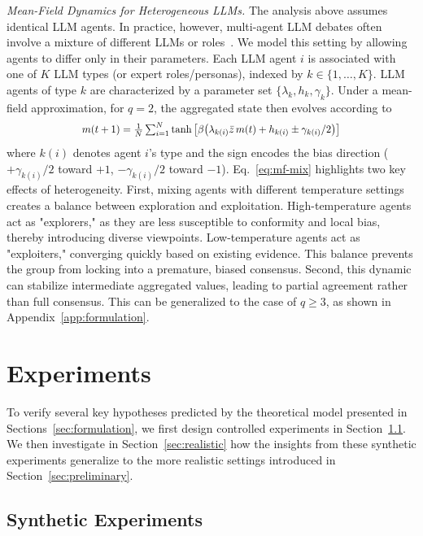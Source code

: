 \documentclass{article}
\theoremstyle{plain}
\theoremstyle{definition}
\theoremstyle{remark}
\begin{document}
\textsl{Mean-Field Dynamics for Heterogeneous LLMs.}
The analysis above assumes identical LLM agents.
In practice, however, multi-agent LLM debates often involve a mixture of different LLMs or roles~\cite{liang2023encouraging,chen2023agentverse}. 
We model this setting by allowing agents to differ only in their parameters. 
Each LLM agent $i$ is associated with one of $K$ LLM types (or expert roles/personas), indexed by $k\in\{1,\dots,K\}$.
LLM agents of type $k$ are characterized by a parameter set $\{\lambda_k, h_k, \gamma_k\}$. 
Under a mean-field approximation, for $q=2$, the aggregated state then evolves according to 
\begin{equation}\label{eq:mf-mix}
\scalebox{0.9}{$m(t+1) = \frac{1}{N} \sum_{i=1}^{N} \tanh \left[
\beta \bigl( \lambda_{k(i)} \bar{z}\, m(t)+h_{k(i)} \pm \gamma_{k(i)}/2 \bigr) \right]$}
\end{equation}
where $k(i)$ denotes agent $i$'s type and the sign encodes the bias direction ($+\gamma_{k(i)}/2$ toward $+1$, $-\gamma_{k(i)}/2$ toward $-1$). 
Eq.~\eqref{eq:mf-mix} highlights two key effects of heterogeneity. 
First, mixing agents with different temperature settings creates a balance between exploration and exploitation. High-temperature agents act as "explorers," as they are less susceptible to conformity and local bias, thereby introducing diverse viewpoints. Low-temperature agents act as "exploiters," converging quickly based on existing evidence. This balance prevents the group from locking into a premature, biased consensus.
Second, this dynamic can stabilize intermediate aggregated values, leading to partial agreement rather than full consensus.
This can be generalized to the case of $q \geq 3$, as shown in Appendix~\ref{app:formulation}. 


\section{Experiments}\label{sec:experiment}  
To verify several key hypotheses predicted by the theoretical model presented in Sections~\ref{sec:formulation}, we first design controlled experiments in Section~\ref{sec:synthetic}. 
We then investigate in Section~\ref{sec:realistic} how the insights from these synthetic experiments generalize to the more realistic settings introduced in Section~\ref{sec:preliminary}.


\subsection{Synthetic Experiments}\label{sec:synthetic}
\end{document}
